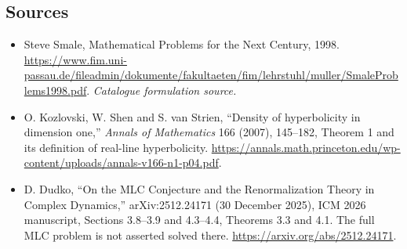 \documentclass[11pt,a4paper]{article}
\begin{document}
\subsection{Sources}
\begin{itemize}\raggedright
\item[\textnormal{[S1]}]\hypertarget{source:215:1}{} Steve Smale, Mathematical Problems for the Next Century, 1998.
\url{https://www.fim.uni-passau.de/fileadmin/dokumente/fakultaeten/fim/lehrstuhl/muller/SmaleProblems1998.pdf}.
{\small\textit{Catalogue formulation source.}}
\item[\textnormal{[E1]}]\hypertarget{extra:215:1}{} O. Kozlovski, W. Shen and S. van Strien, ``Density of hyperbolicity in dimension one,'' \emph{Annals of Mathematics} 166 (2007), 145--182, Theorem 1 and its definition of real-line hyperbolicity.
\url{https://annals.math.princeton.edu/wp-content/uploads/annals-v166-n1-p04.pdf}.
\item[\textnormal{[E2]}]\hypertarget{extra:215:2}{} D. Dudko, ``On the MLC Conjecture and the Renormalization Theory in Complex Dynamics,'' arXiv:2512.24171 (30 December 2025), ICM 2026 manuscript, Sections 3.8--3.9 and 4.3--4.4, Theorems 3.3 and 4.1. The full MLC problem is not asserted solved there.
\url{https://arxiv.org/abs/2512.24171}.
\end{itemize}
\end{document}
